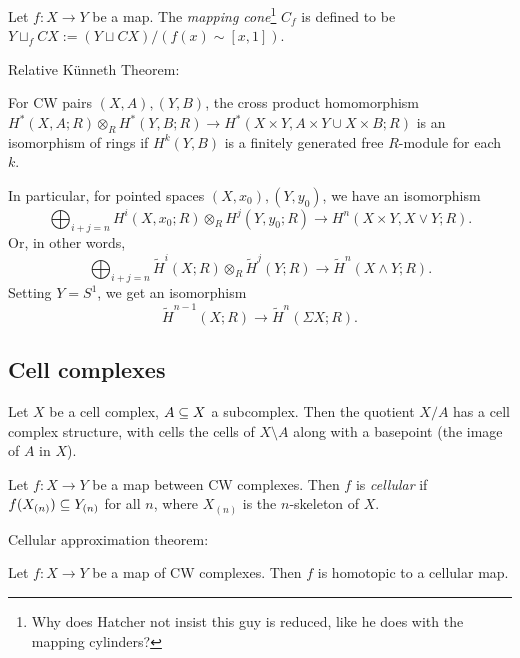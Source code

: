 \documentclass{MetricNotes2023}
\def\subq{\ensuremath\subseteq}
\begin{document}
\begin{definition}
Let \(f : X \to Y\) be a map. The \textit{mapping cone}\footnote{Why does Hatcher not insist this guy is reduced, like he does with the mapping cylinders?} \(C_f\) is defined to be \(Y\sqcup_f CX:=(Y\sqcup CX)/(f(x)\sim [x,1])\). 
\end{definition}

Relative K\"{u}nneth Theorem:

\begin{theorem}
For CW pairs \((X, A), (Y, B)\), the cross product homomorphism \(H^*(X, A; R)\otimes_R H^*(Y,B; R)\to H^*(X\times Y, A\times Y \cup X\times B; R)\) is an isomorphism of rings if \(H^k(Y, B)\) is a finitely generated free \(R\)-module for each \(k\). 
\end{theorem}

In particular, for pointed spaces \((X, x_0), (Y, y_0)\), we have an isomorphism
\[\bigoplus_{i+j=n} H^i(X, x_0; R)\otimes_R H^j(Y,y_0; R)\to H^n(X\times Y, X\vee Y; R).\]
Or, in other words,
\[\bigoplus_{i+j=n} \widetilde H^i(X; R)\otimes_R \widetilde H^j(Y; R)\to \widetilde H^n(X\wedge Y; R).\]
Setting \(Y=S^1\), we get an isomorphism
\[\widetilde H^{n-1}(X; R) \to \widetilde H^n(\Sigma X; R).\]

\subsection{Cell complexes}\label{2502141508}

\begin{definition}
Let \(X\) be a cell complex, \(A\subq X\) a subcomplex. Then the quotient \(X/A\) has a cell complex structure, with cells the cells of \(X\setminus A\) along with a basepoint (the image of \(A\) in \(X\)). 
\end{definition}

\begin{definition}
Let \(f : X \to Y\) be a map between CW complexes. Then \(f\) is \textit{cellular} if \(f(X_{(n)})\subq Y_{(n)}\) for all \(n\), where \(X_{(n)}\) is the \(n\)-skeleton of \(X\). 
\end{definition}

Cellular approximation theorem:

\begin{theorem}\label{2502211420}
Let \(f : X \to Y\) be a map of CW complexes. Then \(f\) is homotopic to a cellular map.
\end{theorem}
\end{document}
